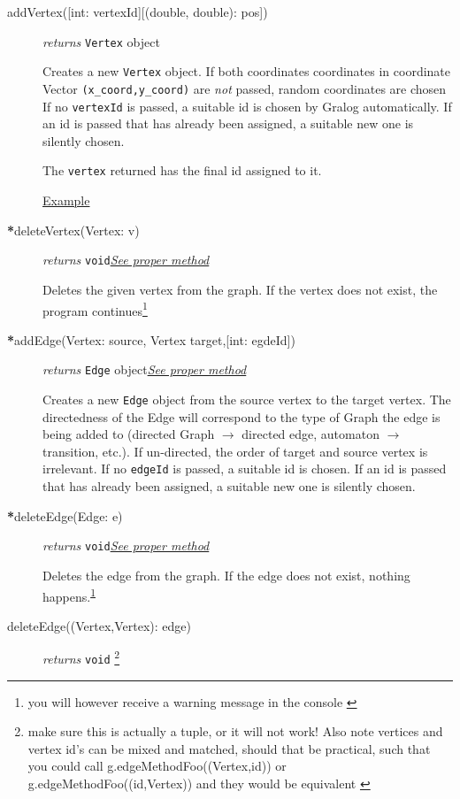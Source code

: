 \begin{description}
\item[addVertex({[int: vertexId]}{[(double, double): pos]})]\emph{returns}
  \texttt{Vertex} object

  Creates a new \texttt{Vertex} object. If both coordinates coordinates in coordinate Vector \texttt{(x\_coord,y\_coord)} are \textit{not} passed,
  random coordinates are chosen
  If no \texttt{vertexId} is passed, a suitable id is
  chosen by Gralog automatically. If an id is passed that has already
  been assigned, a suitable new one is silently chosen.
  
  The \texttt{vertex} returned has the final id assigned to it.
  
  \hyperref[addVertexExample]{Example}

  
\item[\textbf{*}deleteVertex(Vertex: v)] \emph{returns} \texttt{void}\quad \hyperref[deleteVertexClass]{\textit{See proper method}}

Deletes the given vertex from the graph. If the vertex does not exist, the program continues\footnote{you will however receive a warning message in the console \label{deleteVertexWarning}}


\item[\textbf{*}addEdge(Vertex: source, Vertex target,{[int: egdeId]})] \emph{returns} \texttt{Edge} object\quad \hyperref[addEdgeClass]{\textit{See proper method}}


Creates a new \texttt{Edge} object from the source vertex to the
target vertex. The directedness of the Edge will correspond to the type of Graph the edge is being added to (directed Graph $\to$ directed edge, automaton $\to$ transition, etc.). If un-directed, the
order of target and source vertex is irrelevant. If no \texttt{edgeId}
is passed, a suitable id is chosen. If an id is passed that has
already been assigned, a suitable new one is silently chosen.


\item[\textbf{*}deleteEdge(Edge: e)] \emph{returns} \texttt{void}\quad \hyperref[deleteEdgeClass]{\textit{See proper method}}

Deletes the edge from the graph. If the edge does not exist, nothing
happens.\textsuperscript{\ref{deleteVertexWarning}}


\item[deleteEdge((Vertex,Vertex): edge)] \emph{returns} \texttt{void} \footnote{make sure this is actually a tuple, or it will not work! Also note vertices and vertex id's can be mixed and matched, should that be practical, such that you could call g.edgeMethodFoo((Vertex,id)) or g.edgeMethodFoo((id,Vertex)) and they would be equivalent \label{makeSureATupleWarning1}}


\end{description}
